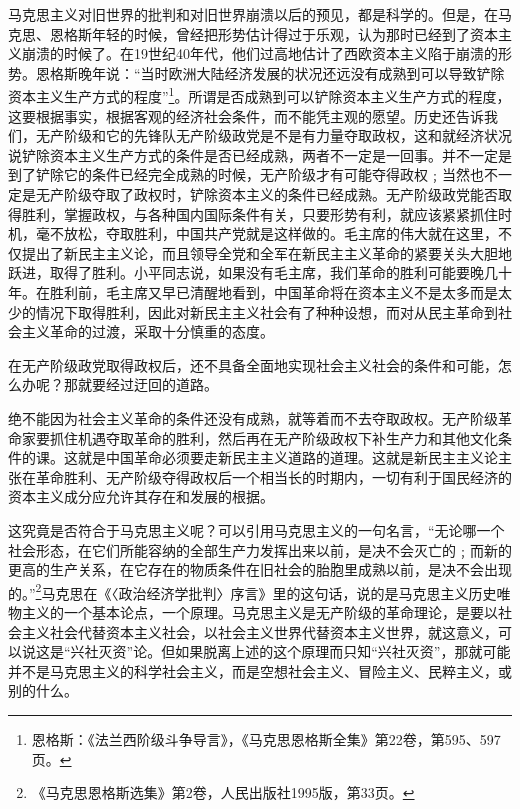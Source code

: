 \documentclass[UTF8, 12pt, a4paper]{ctexrep}
\begin{document}
马克思主义对旧世界的批判和对旧世界崩溃以后的预见，都是科学的。但是，在马克思、恩格斯年轻的时候，曾经把形势估计得过于乐观，认为那时已经到了资本主义崩溃的时候了。在19世纪40年代，他们过高地估计了西欧资本主义陷于崩溃的形势。恩格斯晚年说：“当时欧洲大陆经济发展的状况还远没有成熟到可以导致铲除资本主义生产方式的程度”\footnote{恩格斯：《法兰西阶级斗争导言》，《马克思恩格斯全集》第22卷，第595、597页。}。所谓是否成熟到可以铲除资本主义生产方式的程度，这要根据事实，根据客观的经济社会条件，而不能凭主观的愿望。历史还告诉我们，无产阶级和它的先锋队无产阶级政党是不是有力量夺取政权，这和就经济状况说铲除资本主义生产方式的条件是否已经成熟，两者不一定是一回事。并不一定是到了铲除它的条件已经完全成熟的时候，无产阶级才有可能夺得政权﹔当然也不一定是无产阶级夺取了政权时，铲除资本主义的条件已经成熟。无产阶级政党能否取得胜利，掌握政权，与各种国内国际条件有关，只要形势有利，就应该紧紧抓住时机，毫不放松，夺取胜利，中国共产党就是这样做的。毛主席的伟大就在这里，不仅提出了新民主主义论，而且领导全党和全军在新民主主义革命的紧要关头大胆地跃进，取得了胜利。小平同志说，如果没有毛主席，我们革命的胜利可能要晚几十年。在胜利前，毛主席又早已清醒地看到，中国革命将在资本主义不是太多而是太少的情况下取得胜利，因此对新民主主义社会有了种种设想，而对从民主革命到社会主义革命的过渡，采取十分慎重的态度。

在无产阶级政党取得政权后，还不具备全面地实现社会主义社会的条件和可能，怎么办呢？那就要经过迂回的道路。

绝不能因为社会主义革命的条件还没有成熟，就等着而不去夺取政权。无产阶级革命家要抓住机遇夺取革命的胜利，然后再在无产阶级政权下补生产力和其他文化条件的课。这就是中国革命必须要走新民主主义道路的道理。这就是新民主主义论主张在革命胜利、无产阶级夺得政权后一个相当长的时期内，一切有利于国民经济的资本主义成分应允许其存在和发展的根据。

这究竟是否符合于马克思主义呢？可以引用马克思主义的一句名言，“无论哪一个社会形态，在它们所能容纳的全部生产力发挥出来以前，是决不会灭亡的﹔而新的更高的生产关系，在它存在的物质条件在旧社会的胎胞里成熟以前，是决不会出现的。”\footnote{《马克思恩格斯选集》第2卷，人民出版社1995版，第33页。}马克思在《〈政治经济学批判〉序言》里的这句话，说的是马克思主义历史唯物主义的一个基本论点，一个原理。马克思主义是无产阶级的革命理论，是要以社会主义社会代替资本主义社会，以社会主义世界代替资本主义世界，就这意义，可以说这是“兴社灭资”论。但如果脱离上述的这个原理而只知“兴社灭资”，那就可能并不是马克思主义的科学社会主义，而是空想社会主义、冒险主义、民粹主义，或别的什么。
\end{document}
